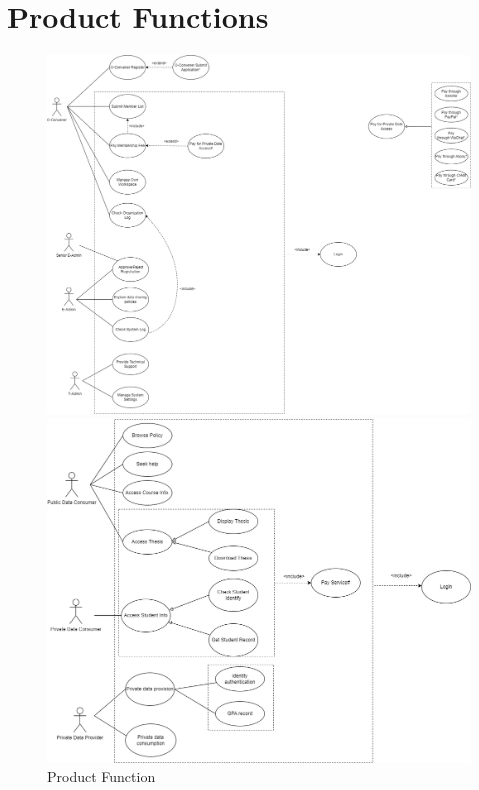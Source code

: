 \section{Product Functions}
\FloatBarrier
\begin{figure}[H]
    \centering
    \begin{minipage}{0.42\linewidth}
        \centering
        \includegraphics[width=\linewidth]{picture/WechatIMG190.jpg}
    \end{minipage}
    \hspace{0.04\linewidth} %
    \begin{minipage}{0.42\linewidth}
        \centering
        \includegraphics[width=\linewidth]{picture/WechatIMG191.jpg}
    \end{minipage}
    \caption{Product Function}
    \label{fig:product-function}
\end{figure}

